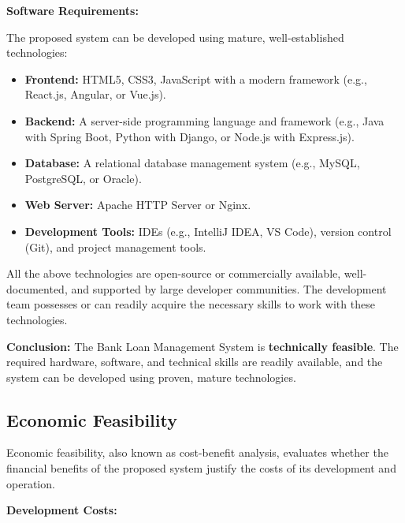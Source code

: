 \textbf{Software Requirements:}

The proposed system can be developed using mature, well-established technologies:

\begin{itemize}
  \item \textbf{Frontend:} HTML5, CSS3, JavaScript with a modern framework (e.g., React.js, Angular, or Vue.js).
  \item \textbf{Backend:} A server-side programming language and framework (e.g., Java with Spring Boot, Python with Django, or Node.js with Express.js).
  \item \textbf{Database:} A relational database management system (e.g., MySQL, PostgreSQL, or Oracle).
  \item \textbf{Web Server:} Apache HTTP Server or Nginx.
  \item \textbf{Development Tools:} IDEs (e.g., IntelliJ IDEA, VS Code), version control (Git), and project management tools.
\end{itemize}

All the above technologies are open-source or commercially available, well-documented, and supported by large developer communities. The development team possesses or can readily acquire the necessary skills to work with these technologies.

\textbf{Conclusion:} The Bank Loan Management System is \textbf{technically feasible}. The required hardware, software, and technical skills are readily available, and the system can be developed using proven, mature technologies.

\subsection{Economic Feasibility}

Economic feasibility, also known as cost-benefit analysis, evaluates whether the financial benefits of the proposed system justify the costs of its development and operation.

\textbf{Development Costs:}

\begin{table}[htbp]
\centering
\small
{}
\end{table}

